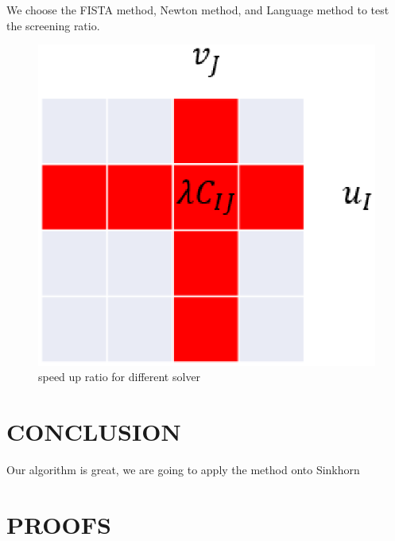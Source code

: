 \documentclass[twoside]{article}
\theoremstyle{plain}
\begin{document}
We choose the FISTA method, Newton method, and Language method to test the screening ratio. 
	\begin{figure}[h]
	\begin{center}	
	\includegraphics[width = \linewidth]{pic/divide}
	\caption{speed up ratio for different solver}
	\end{center}	
	\end{figure}



\section{CONCLUSION}
Our algorithm is great, we are going to apply the method onto Sinkhorn


\clearpage





\clearpage
\appendix

\thispagestyle{empty}


\onecolumn \makesupplementtitle

\section{PROOFS}
\end{document}
